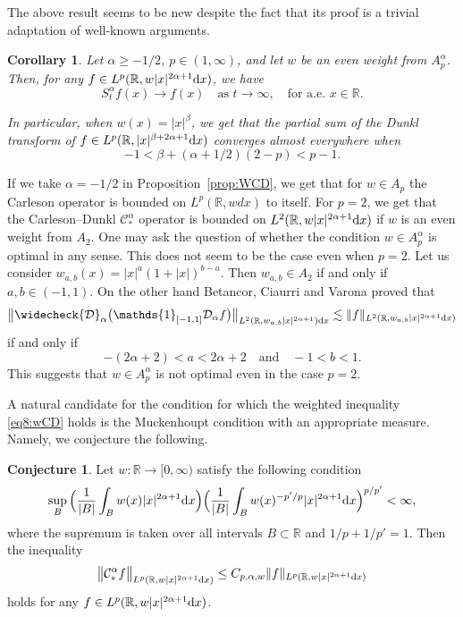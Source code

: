 \documentclass[11pt,oneside]{amsart}
\numberwithin{equation}{section}
\newtheorem{corollary}[equation]{Corollary}
\theoremstyle{definition}
\newtheorem{conj}[equation]{Conjecture}
\newcommand{\RR}{\mathbb{R}}
\newcommand{\calC}{\mathcal{C}}
\newcommand{\calD}{\mathcal{D}}
\begin{document}
The above result seems to be new despite the fact that its proof is a trivial adaptation of well-known arguments.
\begin{corollary}
Let $\alpha\geq-1/2$, $p\in(1,\infty)$, and let $w$ be an even weight from $A_p^\alpha$. Then, for any $f\in L^p(\mathbb{R},w|x|^{2\alpha+1}{\rm d}x)$, we have
\begin{equation*}
    S_t^\alpha f(x) \to f(x) \quad \text{as } t \to \infty, \quad \text{for a.e. } x \in \mathbb{R}.
\end{equation*}

In particular, when $w(x)=|x|^\beta$, we get that the partial sum of the Dunkl transform of $f\in L^p(\RR,|x|^{\beta+2\alpha+1}{\rm d}x)$ converges almost everywhere when
\begin{equation*}
    -1<\beta+(\alpha+1/2)(2-p)<p-1.
\end{equation*}
\end{corollary}
If we take $\alpha=-1/2$ in Proposition~\ref{prop:WCD}, we get that for $w\in A_p$ the Carleson operator is bounded on $L^p(\RR,wdx)$ to itself. For $p=2$, we get that the Carleson--Dunkl ${\calC}_{\ast}^\alpha$ operator is bounded on $L^2(\RR,w|x|^{2\alpha+1}{\rm d}x)$ if $w$ is an even weight from $A_2$. One may ask the question of whether the condition $w\in A_p^\alpha$ is optimal in any sense. This does not seem to be the case even when $p=2$. Let us consider $w_{a,b}(x)=|x|^a(1+|x|)^{b-a}$. Then $w_{a,b}\in A_2$ if and only if $a,b\in(-1,1)$. On the other hand Betancor, Ciaurri and Varona \cite{BCV} proved that 
\begin{equation*}
    \big\|\widecheck{\calD}_{\alpha}\big(\mathds{1}_{[-1,1]} {\calD}_\alpha f\big)\big\|_{L^2(\RR,w_{a,b}|x|^{2\alpha+1}){\rm d}x}\lesssim\|f\|_{L^2(\RR,w_{a,b}|x|^{2\alpha+1}{\rm d}x)}
\end{equation*}
if and only if
\begin{equation*}
    -(2\alpha+2)<a<2\alpha+2\quad \text{and}\quad -1<b<1.
\end{equation*}
This suggests that $w\in A_p^\alpha$ is not optimal even in the case $p=2$. 

A natural candidate for the condition for which the weighted inequality \eqref{eq8:wCD} holds is the Muckenhoupt condition with an appropriate measure. Namely, we conjecture the following.
\begin{conj}
Let $w\colon\RR\to[0,\infty)$ satisfy the following condition
\begin{equation*}
    \sup_{B}\Big(\frac{1}{|B|}\int_B w(x)|x|^{2\alpha+1}{\rm d}x\Big)\Big(\frac{1}{|B|}\int_Bw(x)^{-p'/p}|x|^{2\alpha+1}{\rm d}x\Big)^{p/p'}<\infty,
\end{equation*}
where the supremum is taken over all intervals $B\subset\RR$ and $1/p+1/p'=1$. Then the inequality
\begin{equation*}
    \big\|{\calC}_{\ast}^\alpha f\big\|_{L^p(\RR,w|x|^{2\alpha+1}{\rm d}x)}\leq C_{p,\alpha,w}\|f\|_{L^p(\RR,w|x|^{2\alpha+1}{\rm d}x)}
\end{equation*}
holds for any $f\in L^p(\mathbb{R},w|x|^{2\alpha+1}{\rm d}x)$.
\end{conj}
\end{document}
